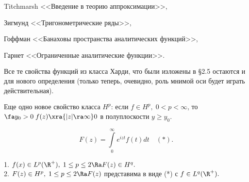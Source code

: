 \documentclass{article}
\begin{document}
\medskip
Titchmarsh <<Введение в  теорию аппроксимации>>,

Зигмунд <<Тригонометрические ряды>>,

Гоффман <<Банаховы пространства аналитических функций>>,

Гарнет <<Ограниченные аналитические функции>>.

\medskip
Все те свойства функций из класса Харди, что были изложены в \S2.5 остаются и для нового определения (только
теперь, очевидно, роль мнимой оси будет играть действительная).

Еще одно новое свойство класса $H^p$: если $f\in H^p,\;0<p<\infty$, то $\fa
y_0>0\;f(z)\xra{|z|\ra\infty}0$ в полуплоскости $y\ge y_0.$

$$F(z)=\int\limits_0^{\infty}e^{izt}f(t)dt\quad (*).$$

\begin{theorem}\label{104}
1. $f(x)\in L^p(\R ^+),\;1\le p\le2\Ra F(z)\in H^q.$ \\\hangindent=2.3cm 2. $F(z)\in
H^p,\;1\le p\le2\Ra F(z)$ представима в виде (*) с $f\in L^q(\R ^+).$
\end{theorem}
\end{document}
